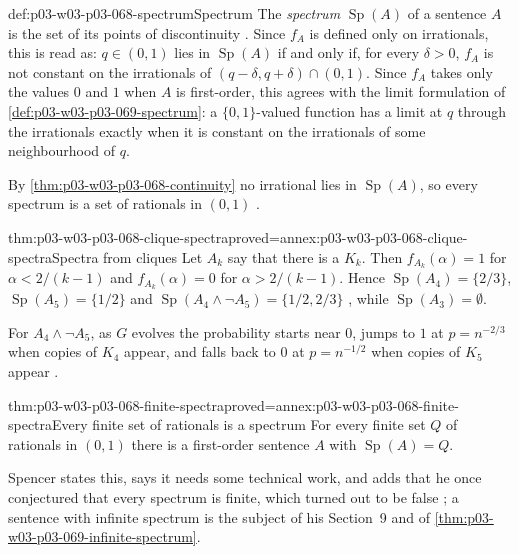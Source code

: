 \begin{hbdefinition}{def:p03-w03-p03-068-spectrum}{Spectrum}
The \emph{spectrum} \(\operatorname{Sp}(A)\) of a sentence \(A\) is the set of its points
of discontinuity \cite[p.~15]{Spencer2007LogicRandomStructuresAuthor}.  Since \(f_A\) is
defined only on irrationals, this is read as: \(q\in(0,1)\) lies in
\(\operatorname{Sp}(A)\) if and only if, for every \(\delta>0\), \(f_A\) is not constant on
the irrationals of \((q-\delta,q+\delta)\cap(0,1)\).  Since \(f_A\) takes
only the values \(0\) and \(1\) when \(A\) is first-order, this agrees with
the limit formulation of \cref{def:p03-w03-p03-069-spectrum}: a
\(\{0,1\}\)-valued function has a limit at \(q\) through the irrationals
exactly when it is constant on the irrationals of some neighbourhood of
\(q\).
\end{hbdefinition}

By \cref{thm:p03-w03-p03-068-continuity} no irrational lies in \(\operatorname{Sp}(A)\),
so every spectrum is a set of rationals in \((0,1)\)
\cite[p.~15]{Spencer2007LogicRandomStructuresAuthor}.

\begin{hbcorollary}{thm:p03-w03-p03-068-clique-spectra}{proved=annex:p03-w03-p03-068-clique-spectra}{Spectra from cliques}
Let \(A_k\) say that there is a \(K_k\).  Then \(f_{A_k}(\alpha)=1\) for
\(\alpha<2/(k-1)\) and \(f_{A_k}(\alpha)=0\) for \(\alpha>2/(k-1)\).  Hence
\(\operatorname{Sp}(A_4)=\{2/3\}\), \(\operatorname{Sp}(A_5)=\{1/2\}\) and
\(\operatorname{Sp}(A_4\wedge\neg A_5)=\{1/2,2/3\}\) \cite[pp.~15--16]{Spencer2007LogicRandomStructuresAuthor},
while \(\operatorname{Sp}(A_3)=\emptyset\).
\end{hbcorollary}

For \(A_4\wedge\neg A_5\), as \(G\) evolves the probability starts near
\(0\), jumps to \(1\) at \(p=n^{-2/3}\) when copies of \(K_4\) appear, and
falls back to \(0\) at \(p=n^{-1/2}\) when copies of \(K_5\) appear
\cite[p.~16]{Spencer2007LogicRandomStructuresAuthor}.

\begin{hbtheorem}{thm:p03-w03-p03-068-finite-spectra}{proved=annex:p03-w03-p03-068-finite-spectra}{Every finite set of rationals is a spectrum}
For every finite set \(Q\) of rationals in \((0,1)\) there is a first-order
sentence \(A\) with \(\operatorname{Sp}(A)=Q\).
\end{hbtheorem}

Spencer states this, says it needs some technical work, and adds that he
once conjectured that every spectrum is finite, which turned out to be false
\cite[p.~16]{Spencer2007LogicRandomStructuresAuthor}; a sentence with infinite spectrum is the
subject of his Section~9 and of \cref{thm:p03-w03-p03-069-infinite-spectrum}.

